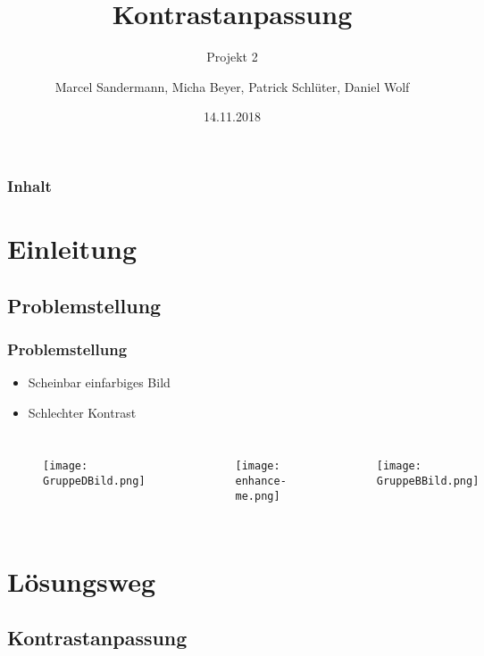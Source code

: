 \documentclass[14pt]{beamer}
\begin{document}
	\author[Gruppe D]{Marcel Sandermann, Micha Beyer, Patrick Schlüter, Daniel Wolf}
	\title{Kontrastanpassung}
	\subtitle{Projekt 2}
	\date{14.11.2018}
	
	
\begin{frame}
	\titlepage
\end{frame}
\begin{frame}
	\frametitle{Inhalt}
	\tableofcontents	
\end{frame}
\section{Einleitung}
\subsection{Problemstellung}
\begin{frame}
	\frametitle{Problemstellung}
	\begin{itemize}
		\item Scheinbar einfarbiges Bild
		\item Schlechter Kontrast	
	\end{itemize}
	\begin{columns}[c]
		\begin{figure}
		\texttt{[image: GruppeDBild.png]}
		\end{figure}
		\begin{figure}
			\texttt{[image: enhance-me.png]}
		\end{figure}
		\begin{figure}
			\texttt{[image: GruppeBBild.png]}
		\end{figure}		 	
	\end{columns}
		
\end{frame}

\section{Lösungsweg}
\subsection{Kontrastanpassung}
\end{document}
